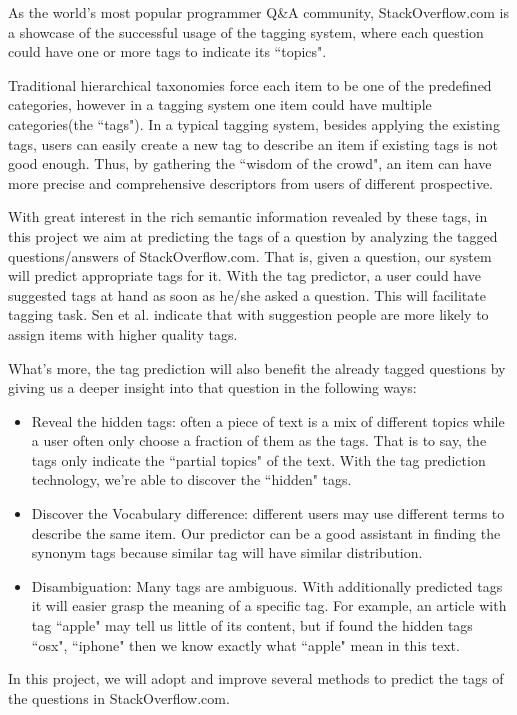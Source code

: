 
As the world's most popular programmer Q\&A community, StackOverflow.com is a showcase of the successful usage of the tagging system, where each question could have one or more tags to indicate its ``topics". 

Traditional hierarchical taxonomies force each item to be one of the predefined categories, however in a tagging system one item could have multiple categories(the ``tags"). In a typical tagging system, besides applying the existing tags, users can easily create a new tag to describe an item if existing tags is not good enough. Thus, by gathering the ``wisdom of the crowd", an item can have more precise and comprehensive descriptors from users of different prospective. 

With great interest in the rich semantic information revealed by these tags, in this project we aim at predicting the tags of a question by analyzing the tagged questions/answers of StackOverflow.com. That is, given a question, our system will predict appropriate tags for it. With the tag predictor, a user could have suggested tags at hand as soon as he/she asked a question. This will facilitate tagging task. Sen et al.\cite{Sen2006} indicate that with suggestion people are more likely to assign items with higher quality tags.

What's more, the tag prediction will also benefit the already tagged questions by giving us a deeper insight into that question in the following ways:

\begin{itemize}
    \item Reveal the hidden tags: often a piece of text is a mix of different topics while a user often only choose a fraction of them as the tags. That is to say, the tags only indicate the ``partial topics" of the text. With the tag prediction technology, we're able to discover the ``hidden" tags.
    \item Discover the Vocabulary difference: different users may use different terms to describe the same item. Our predictor can be a good assistant in finding the synonym tags because similar tag will have similar distribution.
    \item Disambiguation: Many tags are ambiguous. With additionally predicted tags it will easier grasp the meaning of a specific tag. For example, an article with tag ``apple" may tell us little of its content, but if found the hidden tags ``osx", ``iphone" then we know exactly what ``apple" mean in this text.
\end{itemize}

In this project, we will adopt and improve several methods to predict the tags of the questions in StackOverflow.com.
